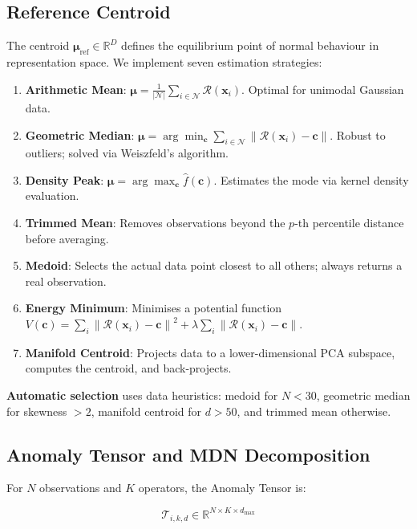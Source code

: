 \documentclass[journal]{IEEEtran}
\newcommand{\R}{\mathbb{R}}
\newcommand{\N}{\mathcal{N}}
\newcommand{\T}{\mathcal{T}}
\newcommand{\calR}{\mathcal{R}}
\newcommand{\norm}[1]{\left\lVert#1\right\rVert}
\begin{document}
\subsection{Reference Centroid}
\label{ssec:centroid}

The centroid $\boldsymbol{\mu}_{\text{ref}} \in \R^D$ defines the equilibrium point of normal behaviour in representation space. We implement seven estimation strategies:

\begin{enumerate}
  \item \textbf{Arithmetic Mean}: $\boldsymbol{\mu} = \frac{1}{|\N|}\sum_{i \in \N} \calR(\mathbf{x}_i)$. Optimal for unimodal Gaussian data.
  \item \textbf{Geometric Median}: $\boldsymbol{\mu} = \arg\min_{\boldsymbol{c}} \sum_{i \in \N} \norm{\calR(\mathbf{x}_i) - \boldsymbol{c}}$. Robust to outliers; solved via Weiszfeld's algorithm.
  \item \textbf{Density Peak}: $\boldsymbol{\mu} = \arg\max_{\boldsymbol{c}} \hat{f}(\boldsymbol{c})$. Estimates the mode via kernel density evaluation.
  \item \textbf{Trimmed Mean}: Removes observations beyond the $p$-th percentile distance before averaging.
  \item \textbf{Medoid}: Selects the actual data point closest to all others; always returns a real observation.
  \item \textbf{Energy Minimum}: Minimises a potential function $V(\boldsymbol{c}) = \sum_i \norm{\calR(\mathbf{x}_i) - \boldsymbol{c}}^2 + \lambda\sum_i \norm{\calR(\mathbf{x}_i) - \boldsymbol{c}}$.
  \item \textbf{Manifold Centroid}: Projects data to a lower-dimensional PCA subspace, computes the centroid, and back-projects.
\end{enumerate}

\textbf{Automatic selection} uses data heuristics: medoid for $N < 30$, geometric median for skewness $> 2$, manifold centroid for $d > 50$, and trimmed mean otherwise.

\subsection{Anomaly Tensor and MDN Decomposition}
\label{ssec:tensor}

For $N$ observations and $K$ operators, the Anomaly Tensor is:

\begin{equation}
\T_{i,k,d} \in \R^{N \times K \times d_{\max}}
\label{eq:tensor}
\end{equation}
\end{document}
